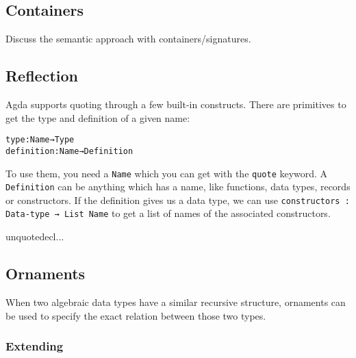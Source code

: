 




\subsection{Containers}

Discuss the semantic approach with containers/signatures.

\subsection{Reflection}\label{sec:lit-reflection}

Agda supports quoting through a few built-in constructs.
There are primitives to get the type and definition of a given name:

\begin{alltt}
type         : Name → Type
definition   : Name → Definition
\end{alltt}

To use them, you need a \texttt{Name} which you can get with the
\texttt{quote} keyword.
A \texttt{Definition} can be anything which has a name, like
functions, data types, records or constructors.
If the definition gives us a data type, we can use 
\texttt{constructors : Data-type → List Name} to get a list of names
of the associated constructors.


unquotedecl...


\subsection{Ornaments}\label{sec:lit-ornaments}

When two algebraic data types have a similar recursive structure,
ornaments can be used to specify the exact relation between those two
types.

\subsubsection{Extending}

